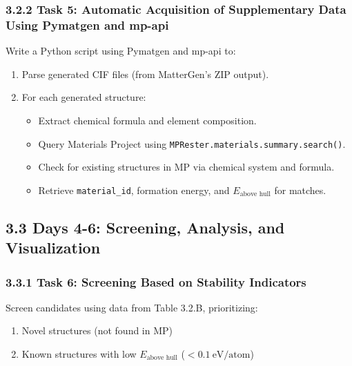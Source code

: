 \documentclass[letterpaper]{article} %
\begin{document}
\subsubsection{3.2.2 Task 5: Automatic Acquisition of Supplementary Data Using Pymatgen and mp-api}

Write a Python script using Pymatgen and mp-api to:
\begin{enumerate}
    \item Parse generated CIF files (from MatterGen's ZIP output).
    \item For each generated structure:
    \begin{itemize}
        \item Extract chemical formula and element composition.
        \item Query Materials Project using \texttt{MPRester.materials.summary.search()}.
        \item Check for existing structures in MP via chemical system and formula.
        \item Retrieve \texttt{material\_id}, formation energy, and $E_{\text{above hull}}$ for matches.
    \end{itemize}
\end{enumerate}

\subsection{3.3 Days 4-6: Screening, Analysis, and Visualization}

\subsubsection{3.3.1 Task 6: Screening Based on Stability Indicators}
Screen candidates using data from Table 3.2.B, prioritizing:
\begin{enumerate}
    \item Novel structures (not found in MP)
    \item Known structures with low $E_{\text{above hull}}$ ($< 0.1\ \text{eV/atom}$)
\end{enumerate}
\end{document}
